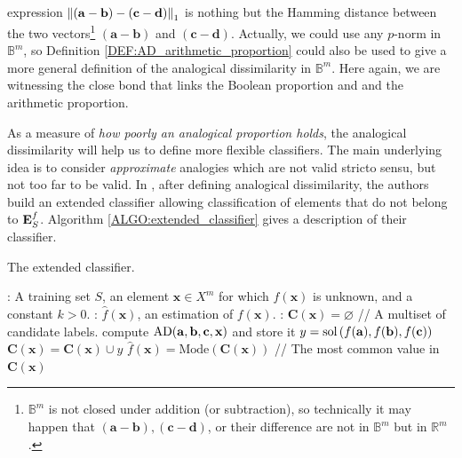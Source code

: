 expression $\norm{1}{(\mathbf{a}-\mathbf{b})-(\mathbf{c}-\mathbf{d})}$ is
nothing but the Hamming distance between the two vectors\footnote{$\mathbb{B}^m$
is not closed under addition (or subtraction), so technically it may happen that
$(\mathbf{a} - \mathbf{b}), (\mathbf{c} - \mathbf{d})$, or their difference are
not in $\mathbb{B}^m$ but in $\mathbb{R}^m$.}
$(\mathbf{a}-\mathbf{b})$ and $(\mathbf{c}-\mathbf{d})$.
Actually, we could use any $p$-norm in $\mathbb{B}^m$, so
Definition \ref{DEF:AD_arithmetic_proportion} could also be used to give a more
general definition of the analogical dissimilarity in $\mathbb{B}^m$. Here
again, we are witnessing the close bond that links the Boolean proportion and
and the arithmetic proportion.

As a measure of \textit{how poorly an analogical proportion holds}, the
analogical dissimilarity will help us to define more flexible classifiers.  The
main underlying idea is to consider {\it approximate} analogies which are not
valid stricto sensu, but not too far to be valid.
In \cite{BayMicDelIJCAI07}, after defining analogical dissimilarity,  the authors
build an extended classifier allowing classification of elements that do not
belong to $\esf$. Algorithm \ref{ALGO:extended_classifier} gives a
description of their classifier.

\begin{algorithm}[!ht]
 \caption{The extended classifier.}
       \label{ALGO:extended_classifier}
       \begin{algorithmic}

      : A training set $S$, an element $\mathbf{x} \in X^m$
         for which $f(\mathbf{x})$ is unknown, and a constant $k > 0$.
         : $\hat{f}(\mathbf{x})$, an estimation of
         $f(\mathbf{x})$.
    : $\mathbf{C}(\mathbf{x}) = \varnothing$ \quad \quad // A
    multiset of candidate labels.
         \STATE compute $\AD(\mathbf{a}, \mathbf{b}, \mathbf{c}, \mathbf{x})$ and store it
	    \ENDFOR
        \STATE $y = \sol\left(f(\mathbf{a}), f(\mathbf{b}), f(\mathbf{c})\right)$
    \STATE $ \mathbf{C}(\mathbf{x}) = \mathbf{C}(\mathbf{x}) \cup y$
    \ENDFOR
    \STATE $\hat{f}(\mathbf{x}) = \text{Mode} (\mathbf{C}(\mathbf{x}))$ // The
         most common value in $\mathbf{C}(\mathbf{x})$
\end{algorithmic}
\end{algorithm}


